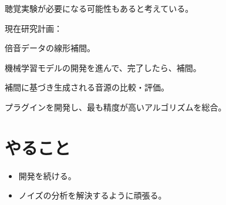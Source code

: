 \documentclass[a4paper, 11pt]{article}
\begin{document}
聴覚実験が必要になる可能性もあると考えている。

現在研究計画：

倍音データの線形補間。

機械学習モデルの開発を進んで、完了したら、補間。

補間に基づき生成される音源の比較・評価。

プラグインを開発し、最も精度が高いアルゴリズムを総合。


\section*{やること}
\begin{itemize}
    \item 開発を続ける。
    \item ノイズの分析を解決するように頑張る。
\end{itemize}



\end{document}
